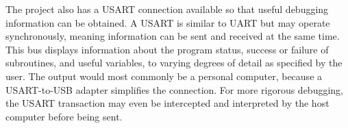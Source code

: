 The project also has a USART connection available so that useful debugging information can be obtained. A USART is similar to UART but may operate synchronously, meaning information can be sent and received at the same time. This bus displays information about the program status, success or failure of subroutines, and useful variables, to varying degrees of detail as specified by the user. The output would most commonly be a personal computer, because a USART-to-USB adapter simplifies the connection. For more rigorous debugging, the USART transaction may even be intercepted and interpreted by the host computer before being sent.

